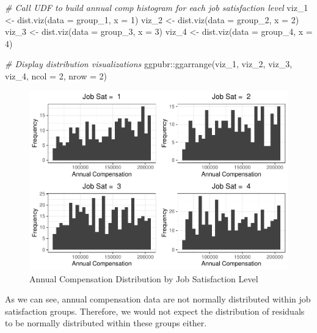 \documentclass[
]{book}
\newenvironment{Shaded}{\begin{snugshade}}{\end{snugshade}}
\newcommand{\AttributeTok}[1]{\textcolor[rgb]{0.77,0.63,0.00}{#1}}
\newcommand{\CommentTok}[1]{\textcolor[rgb]{0.56,0.35,0.01}{\textit{#1}}}
\newcommand{\DecValTok}[1]{\textcolor[rgb]{0.00,0.00,0.81}{#1}}
\newcommand{\FunctionTok}[1]{\textcolor[rgb]{0.00,0.00,0.00}{#1}}
\newcommand{\NormalTok}[1]{#1}
\newcommand{\OtherTok}[1]{\textcolor[rgb]{0.56,0.35,0.01}{#1}}
\newcommand{\SpecialCharTok}[1]{\textcolor[rgb]{0.00,0.00,0.00}{#1}}
\begin{document}
\begin{Shaded}
\begin{Highlighting}[]
\CommentTok{\# Call UDF to build annual comp histogram for each job satisfaction level}
\NormalTok{viz\_1 }\OtherTok{\textless{}{-}} \FunctionTok{dist.viz}\NormalTok{(}\AttributeTok{data =}\NormalTok{ group\_1, }\AttributeTok{x =} \DecValTok{1}\NormalTok{)}
\NormalTok{viz\_2 }\OtherTok{\textless{}{-}} \FunctionTok{dist.viz}\NormalTok{(}\AttributeTok{data =}\NormalTok{ group\_2, }\AttributeTok{x =} \DecValTok{2}\NormalTok{)}
\NormalTok{viz\_3 }\OtherTok{\textless{}{-}} \FunctionTok{dist.viz}\NormalTok{(}\AttributeTok{data =}\NormalTok{ group\_3, }\AttributeTok{x =} \DecValTok{3}\NormalTok{)}
\NormalTok{viz\_4 }\OtherTok{\textless{}{-}} \FunctionTok{dist.viz}\NormalTok{(}\AttributeTok{data =}\NormalTok{ group\_4, }\AttributeTok{x =} \DecValTok{4}\NormalTok{)}

\CommentTok{\# Display distribution visualizations}
\NormalTok{ggpubr}\SpecialCharTok{::}\FunctionTok{ggarrange}\NormalTok{(viz\_1, viz\_2, viz\_3, viz\_4,}
          \AttributeTok{ncol =} \DecValTok{2}\NormalTok{, }\AttributeTok{nrow =} \DecValTok{2}\NormalTok{)}
\end{Highlighting}
\end{Shaded}

\begin{figure}

{\centering \includegraphics{People_Analytics_Lifecycle_files/figure-latex/comp-dist-1} 

}

\caption{Annual Compensation Distribution by Job Satisfaction Level}\label{fig:comp-dist}
\end{figure}

As we can see, annual compensation data are not normally distributed within job satisfaction groups. Therefore, we would not expect the distribution of residuals to be normally distributed within these groups either.
\end{document}
